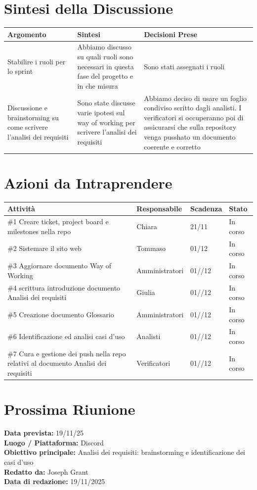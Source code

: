 \documentclass[a4paper,12pt]{article}
\begin{document}
\section*{ Sintesi della Discussione}

\begin{longtable}{|p{}|p{}|p{}|}
\hline
\textbf{Argomento} & \textbf{Sintesi} & \textbf{Decisioni Prese} \\ \hline
 Stabilire i ruoli per lo sprint&Abbiamo discusso su quali ruoli sono necessari in questa fase del progetto e in che misura&Sono stati assegnati i ruoli  \\ \hline
Discussione e brainstorming su come scrivere l'analisi dei requisiti& Sono state discusse varie ipotesi sul way of working per scrivere l'analisi dei requisiti  &Abbiamo deciso di usare un foglio condiviso scritto dagli analisti. I verificatori si occuperanno poi di assicurarsi che sulla repository venga pusshato un documento coerente e corretto  \\ \hline
\end{longtable}


\section*{ Azioni da Intraprendere}

\begin{longtable}{|p{}|p{}|p{}|p{}|}
\hline
\textbf{Attività} & \textbf{Responsabile} & \textbf{Scadenza} & \textbf{Stato} \\ \hline
 \#1 Creare ticket, project board e milestones nella repo&Chiara & 21/11 &In corso \\ \hline
  \#2 Sistemare il sito web&Tommaso  & 01/12 &In corso \\ \hline
  \#3 Aggiornare documento Way of Working&Amministratori  & 01//12 &In corso \\ \hline
  \#4 scrittura introduzione documento Analisi dei requisiti &Giulia  & 01//12 &In corso \\ \hline
  \#5 Creazione documento Glossario&Amministratori  & 01//12 &In corso \\ \hline
  \#6 Identificazione ed analisi casi d'uso&Analisti  & 01//12 &In corso \\ \hline
  \#7 Cura e gestione dei push nella repo relativi al documento Analisi dei requisiti&Verificatori  & 01//12 &In corso \\ \hline
  
\end{longtable}



\section*{ Prossima Riunione}
\textbf{Data prevista:} 19/11/25\\
\textbf{Luogo / Piattaforma:} Discord \\
\textbf{Obiettivo principale:} Analisi dei requisiti: brainstorming e identificazione dei casi d'uso\\


\textbf{Redatto da:} Joseph Grant \\
\textbf{Data di redazione:} 19/11/2025
\end{document}
